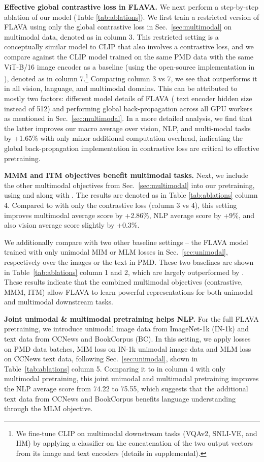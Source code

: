 \documentclass[10pt,twocolumn,letterpaper]{article}
\newcommand{\myparagraph}[1]{\vspace{0.25em}\noindent\textbf{#1}}
\begin{document}
\myparagraph{Effective global contrastive loss in FLAVA.} We next perform a step-by-step ablation of our model (Table \ref{tab:ablations}). We first train a restricted version of FLAVA using only the global contrastive loss  in Sec.~\ref{sec:multimodal} on multimodal data, denoted as  in column 3. This restricted setting is a conceptually similar model to CLIP \cite{radford2021learning} that also involves a contrastive loss, and we compare against the CLIP model trained on the same PMD data with the same ViT-B/16 image encoder as a baseline (using the open-source implementation in \cite{ilharco_gabriel_2021_5143773}), denoted as  in column 7.\footnote{We fine-tune CLIP on multimodal downstream tasks (VQAv2, SNLI-VE, and HM) by applying a classifier on the concatenation of the two output vectors from its image and text encoders (details in supplemental).} Comparing column 3 vs 7, we see that  outperforms it in all vision, language, and multimodal domains. This can be attributed to mostly two factors: different model details of FLAVA ( text encoder hidden size instead of 512) and performing global back-propagation across all GPU workers as mentioned in Sec.~\ref{sec:multimodal}. In a more detailed analysis, we find that the latter improves our macro average over vision, NLP, and multi-modal tasks by +1.65\% with only minor additional computation overhead, indicating the global back-propagation implementation in contrastive loss are critical to effective pretraining.

\myparagraph{MMM and ITM objectives benefit multimodal tasks.} Next, we include the other multimodal objectives from Sec.~\ref{sec:multimodal} into our pretraining, using  and  along with . The results are denoted as  in Table \ref{tab:ablations} column 4. Compared to  with only the contrastive loss  (column 3 vs 4), this setting improves multimodal average score by +2.86\%, NLP average score by +9\%, and also vision average score slightly by +0.3\%.

We additionally compare  with two other baseline settings -- the FLAVA model trained with only unimodal MIM or MLM losses in Sec.~\ref{sec:unimodal}, respectively over the images or the text in PMD. These two baselines are shown in Table~\ref{tab:ablations} column 1 and 2, which are largely outperformed by . These results indicate that the combined multimodal objectives (contrastive, MMM, ITM) allow FLAVA to learn powerful representations for both unimodal and multimodal downstream tasks.

\myparagraph{Joint unimodal \& multimodal pretraining helps NLP.} For the full FLAVA pretraining, we introduce unimodal image data from ImageNet-1k (IN-1k) and text data from CCNews and BookCorpus (BC). In this setting, we apply  losses on PMD data batches, MIM loss on IN-1k unimodal image data and MLM loss on CCNews text data, following Sec.~\ref{sec:unimodal}, shown in Table~\ref{tab:ablations} column 5. Comparing it to  in column 4 with only multimodal pretraining, this joint unimodal and multimodal pretraining improves the NLP average score from 74.22 to 75.55, which suggests that the additional text data from CCNews and BookCorpus benefits language understanding through the MLM objective.
\end{document}
